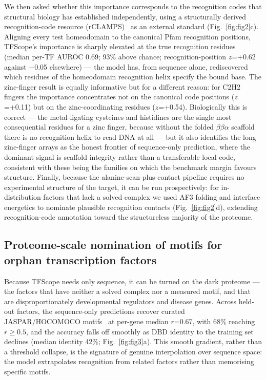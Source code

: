 \documentclass[11pt,letterpaper]{article}
\begin{document}
We then asked whether this importance corresponds to the recognition codes that structural biology
has established independently, using a structurally derived recognition-code resource
(rCLAMPS)~\cite{Wolfe2000,Najafabadi2015} as an external standard
(Fig.~\ref{fig:fig2}c). Aligning every test homeodomain to the canonical Pfam recognition
positions, TFScope's importance is sharply elevated at the true recognition residues (median
per-TF AUROC 0.69; 93\% above chance; recognition-position $z$=+0.62 against $-$0.05 elsewhere) ---
the model has, from sequence alone, rediscovered which residues of the homeodomain recognition
helix specify the bound base. The zinc-finger result is equally informative but for a different
reason: for C2H2 fingers the importance concentrates not on the canonical code positions
($z$=+0.11) but on the zinc-coordinating residues ($z$=+0.54). Biologically this is correct ---
the metal-ligating cysteines and histidines are the single most consequential residues for a zinc
finger, because without the folded $\beta\beta\alpha$ scaffold there is no recognition helix to
read DNA at all --- but it also identifies the long zinc-finger arrays as the honest frontier of
sequence-only prediction, where the dominant signal is scaffold integrity rather than a
transferable local code, consistent with these being the families on which the benchmark margin
favours structure. Finally, because the alanine-scan-plus-contact pipeline requires no
experimental structure of the target, it can be run prospectively: for in-distribution factors
that lack a solved complex we used AF3 folding and interface energetics to nominate plausible
recognition contacts (Fig.~\ref{fig:fig2}d), extending recognition-code annotation toward the
structureless majority of the proteome.

\subsection*{Proteome-scale nomination of motifs for orphan transcription factors}
Because TFScope needs only sequence, it can be turned on the dark proteome --- the factors that
have neither a solved complex nor a measured motif, and that are disproportionately developmental
regulators and disease genes. Across held-out factors, the sequence-only predictions recover
curated JASPAR/HOCOMOCO motifs~\cite{CastroMondragon2022} at per-gene median $r$=0.67, with 68\%
reaching $r\geq0.5$, and the accuracy falls off smoothly as DBD identity to the training set
declines (median identity 42\%; Fig.~\ref{fig:fig3}a). This smooth gradient, rather than a
threshold collapse, is the signature of genuine interpolation over sequence space: the model
extrapolates recognition from related factors rather than memorising specific motifs.
\end{document}
